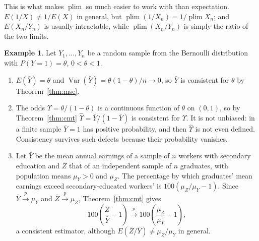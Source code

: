 \documentclass[11pt,a4paper]{article}
\numberwithin{equation}{section}
\DeclareMathOperator{\Var}{Var}
\DeclareMathOperator{\plim}{plim}
\theoremstyle{definition}
\newtheorem{exa}[thm]{Example}
\begin{document}
This is what makes $\plim$ so much easier to work with than expectation. $E(1/X) \neq 1/E(X)$ in general, but $\plim(1/X_n) = 1/\plim X_n$; and
$E(X_n/Y_n)$ is usually intractable, while $\plim(X_n/Y_n)$ is simply the ratio of the two limits.

\begin{exa}
\label{ex:bernoulli}
Let $Y_1, \dots, Y_n$ be a random sample from the Bernoulli distribution with $P(Y = 1) = \theta$, $0 < \theta < 1$.
\begin{enumerate}[label=(\roman*)]
\item $E(\bar Y) = \theta$ and $\Var(\bar Y) = \theta(1 - \theta)/n \to 0$, so $\bar Y$ is consistent for $\theta$ by Theorem~\ref{thm:mse}.
\item The odds $\Upsilon = \theta/(1 - \theta)$ is a continuous function of $\theta$ on $(0, 1)$, so by Theorem~\ref{thm:cmt}
$\hat\Upsilon = \bar Y/(1 - \bar Y)$ is consistent for $\Upsilon$. It is not unbiased: in a finite sample $\bar Y = 1$ has positive probability, and
then $\hat\Upsilon$ is not even defined. Consistency survives such defects because their probability vanishes.
\item Let $\bar Y$ be the mean annual earnings of a sample of $n$ workers with secondary education and $\bar Z$ that of an independent sample of
$n$ graduates, with population means $\mu_Y > 0$ and $\mu_Z$. The percentage by which graduates' mean earnings exceed secondary-educated
workers' is $100(\mu_Z/\mu_Y - 1)$. Since $\bar Y \xrightarrow{p} \mu_Y$ and $\bar Z \xrightarrow{p} \mu_Z$, Theorem~\ref{thm:cmt} gives
\[
100\left(\frac{\bar Z}{\bar Y} - 1\right) \xrightarrow{p} 100\left(\frac{\mu_Z}{\mu_Y} - 1\right),
\]
a consistent estimator, although $E(\bar Z/\bar Y) \neq \mu_Z/\mu_Y$ in general.
\end{enumerate}
\end{exa}
\end{document}
